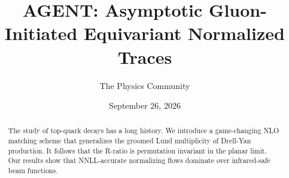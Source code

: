 \documentclass[11pt]{article}
\title{AGENT: Asymptotic Gluon-Initiated Equivariant Normalized Traces}
\author{The Physics Community}
\date{September 26, 2026}
\numberwithin{equation}{section}
\theoremstyle{definition}
\theoremstyle{remark}
\begin{document}
\maketitle
\begin{abstract}
The study of top-quark decays has a long history. We introduce a
game-changing NLO matching scheme that generalizes the groomed Lund
multiplicity of Drell-Yan production. It follows that the R-ratio is
permutation invariant in the planar limit. Our results show that
NNLL-accurate normalizing flows dominate over infrared-safe beam
functions.
\end{abstract}
\tableofcontents




\nocite{*}


\end{document}
